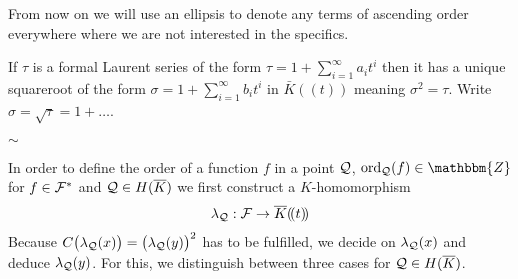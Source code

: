 \documentclass[english,11pt,a4paper]{article}
\begin{document}
From now on we will use an ellipsis to denote any terms of ascending order everywhere where we are not interested in the specifics.

If $\tau$ is a formal Laurent series of the form $\tau = 1 + \sum_{i = 1}^{\infty} a_i t^i$ then it has a unique squareroot of the form $\sigma = 1+\sum_{i = 1}^{\infty} b_i t^i$ in $\bar K (\! (t)\! )$ meaning $\sigma^2 = \tau$. Write $\sigma = \sqrt \tau = 1 + \dots$.

\vspace{-3mm}
\begin{center}
$\sim$
\end{center}

In order to define the order of a function $f$ in a point $\mathcal{Q}$, $\ordq (f) \in \mathbbm{Z}$ for $f \in \mathcal{F}^*$ and $\mathcal{Q} \in H(\overline K)$ we first construct a $K$-homomorphism
\begin{align*}
  \lambda_{\mathcal{Q}}: \mathcal{F} \rightarrow \overline K (\! (t)\! )
\end{align*}
Because $C\big(\lambda_{\mathcal{Q}}(x)\big)=\big(\lambda_{\mathcal{Q}}(y)\big)^2$ has to be fulfilled, we decide on $\lambda_{\mathcal{Q}}(x)$ and deduce $\lambda_{\mathcal{Q}}(y)$. For this, we distinguish between three cases for $\mathcal{Q} \in H(\overline K)$.
\end{document}

